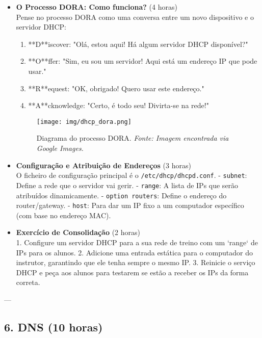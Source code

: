 \documentclass[10pt,a4paper]{article}
\begin{document}
	\begin{itemize}
		\item \textbf{O Processo DORA: Como funciona?} (4 horas) \\
		Pense no processo DORA como uma conversa entre um novo dispositivo e o servidor DHCP:
		\begin{enumerate}
			\item **D**iscover: "Olá, estou aqui! Há algum servidor DHCP disponível?"
			\item **O**ffer: "Sim, eu sou um servidor! Aqui está um endereço IP que pode usar."
			\item **R**equest: "OK, obrigado! Quero usar este endereço."
			\item **A**cknowledge: "Certo, é todo seu! Divirta-se na rede!"
		\end{enumerate}
		
		\begin{figure}[h]
			\centering
			\texttt{[image: img/dhcp\_dora.png]}
			\caption{Diagrama do processo DORA. \textit{Fonte: Imagem encontrada via Google Images.}}
			\label{fig:dhcp_dora}
		\end{figure}
		
		\item \textbf{Configuração e Atribuição de Endereços} (3 horas) \\
		O ficheiro de configuração principal é o \texttt{/etc/dhcp/dhcpd.conf}.
		- \texttt{subnet}: Define a rede que o servidor vai gerir.
		- \texttt{range}: A lista de IPs que serão atribuídos dinamicamente.
		- \texttt{option routers}: Define o endereço do router/gateway.
		- \texttt{host}: Para dar um IP fixo a um computador específico (com base no endereço MAC).
		
		\item \textbf{Exercício de Consolidação} (2 horas) \\
		1. Configure um servidor DHCP para a sua rede de treino com um `range` de IPs para os alunos.
		2. Adicione uma entrada estática para o computador do instrutor, garantindo que ele tenha sempre o mesmo IP.
		3. Reinicie o serviço DHCP e peça aos alunos para testarem se estão a receber os IPs da forma correta.
	\end{itemize}
	
	---
	
	\subsection*{6. DNS (10 horas)}
	\vspace{-1.2em}
\end{document}
